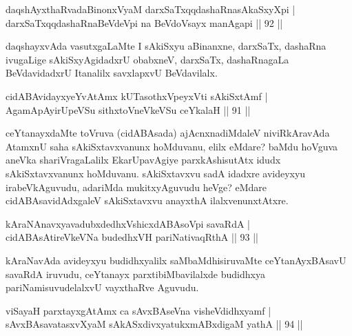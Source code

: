 
\begin{shl}
daqshAyxthaRvadaBinonxV\s yaM darxSaTxqqdashaRnasAkaSxyXpi | \\
darxSaTxqqdashaRnaBeVdeV\s pi na BeVdoV\s sayx manAgapi \hfill||  92 ||  
\end{shl}

\begin{artha}
daqshayxvAda vasutxgaLaMte I sAkiSxyu aBinanxne, darxSaTx, dashaRna ivugaLige sAkiSxyAgidadxrU obabxneV, darxSaTx, dashaRnagaLa BeVdavidadxrU Itanalilx savxlapxvU BeVdavilalx.
\end{artha}


\begin{shl}
cidABAvidayxyeYvA\s \s tAmx kUTasothxV\s peyxVti sAkiSxtAmf | \\
AgamApAyirUpeVSu sithxtoV\s neVkeVSu ceYkalaH \hfill||  91 ||  
\end{shl}

\begin{artha}
ceYtanayxdaMte toVruva (cidABAsada) ajAcnxnadiMdaleV niviRkAravAda AtamxnU saha sAkiSxtavxvanunx hoMduvanu, elilx eMdare? baMdu hoVguva aneVka shariVragaLalilx EkarUpavAgiye parxkAshisutAtx idudx sAkiSxtavxvanunx hoMduvanu. sAkiSxtavxvu sadA idadxre avideyxyu irabeVkAguvudu, adariMda mukitxyAguvudu heVge? eMdare cidABAsavidAdxgaleV sAkiSxtavxvu anayxthA ilalxvenunxtAtxre. 
\end{artha}

\begin{shl}
kAraNAnavxyavadubxdedhxVshicxdABAsoV\s pi savaRdA | \\
cidABAsAtireVkeVNa budedhxVH pariNativaqRthA \hfill||  93 ||  
\end{shl}

\begin{artha}
kAraNavAda avideyxyu budidhxyalilx saMbaMdhisiruvaMte ceYtanAyxBAsavU savaRdA iruvudu, ceYtanayx parxtibiMbavilalxde budidhxya pariNamisuvudelalxvU vayxthaRve Aguvudu.
\end{artha}


\begin{shl}
viSayaH parxtayxgAtAmx ca sAvxBAseVna visheVdidhxyamf | \\
sAvxBAsavatasxvXyaM sAkASxdivxyatukxmABxdigaM yathA \hfill|| 94 ||  
\end{shl}

